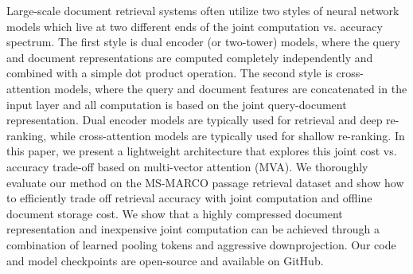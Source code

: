 Large-scale document retrieval systems often utilize two styles of neural network models which live at two different ends of the joint computation vs. accuracy spectrum. The first style is dual encoder (or two-tower) models, where the query and document representations are computed completely independently and combined with a simple dot product operation. The second style is cross-attention models, where the query and document features are concatenated in the input layer and all computation is based on the joint query-document representation. Dual encoder models are typically used for retrieval and deep re-ranking, while cross-attention models are typically used for shallow re-ranking. In this paper, we present a lightweight architecture that explores this joint cost vs. accuracy trade-off based on multi-vector attention (MVA). We thoroughly evaluate our method on the MS-MARCO passage retrieval dataset and show how to efficiently trade off retrieval accuracy with joint computation and offline document storage cost. We show that a highly compressed document representation and inexpensive joint computation can be achieved through a combination of learned pooling tokens and aggressive downprojection. Our code and model checkpoints  are open-source and available on GitHub.
